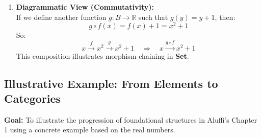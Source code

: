 \documentclass[10pt]{article}
\theoremstyle{plain}
\theoremstyle{definition}
\begin{document}
\begin{enumerate}
  	\item \textbf{Diagrammatic View (Commutativity):} \\
  	If we define another function \( g : B \to \mathbb{R} \) such that \( g(y) = y + 1 \), then:
  	\[
  	g \circ f(x) = f(x) + 1 = x^2 + 1
  	\]
  	So:
  	\[
  	x \xrightarrow{f} x^2 \xrightarrow{g} x^2 + 1
  	\quad \Rightarrow \quad
  	x \xrightarrow{g \circ f} x^2 + 1
  	\]
  	This composition illustrates morphism chaining in \textbf{Set}.
  \end{enumerate}
  
  
  \subsection*{Illustrative Example: From Elements to Categories}
  
  \textbf{Goal:} To illustrate the progression of foundational structures in Aluffi's Chapter 1 using a concrete example based on the real numbers.
  
\end{document}

